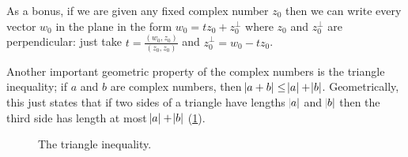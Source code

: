 \documentclass[a4paper,10pt,titlepage]{article}
\theoremstyle{definition}
\newcommand*\realp[1]{ \mathfrak{Re} \left ( {#1} \right )  }
\newcommand*\imagp[1]{ \mathfrak{Im} \left ( {#1} \right )  }
\begin{document}
As a bonus, if we are given any fixed complex number $ z_0 $ then we can write every vector $ w_0 $ in the plane in the form $ w_0 = tz_0 + z_0^\perp $
where $ z_0 $ and $ z_0^\perp $ are perpendicular: just take $ t = \frac{(w_0, z_0)}{(z_0, z_0)} $ and $ z_0^\perp = w_0 - tz_0 $.

Another important geometric property of the complex numbers is the triangle inequality; if $ a $ and $ b $ are
complex numbers, then $ \abs{a + b} \leq \abs{a} + \abs{b} $. Geometrically, this just states that if two sides
of a triangle have lengths $ \abs{a} $ and $ \abs{b} $ then the third side has length at most $ \abs{a} + \abs{b} $ (\cref{fig:triangleineq}).

\begin{figure}
  \centering
  \caption{The triangle inequality.\label{fig:triangleineq}}
\end{figure}
\end{document}
